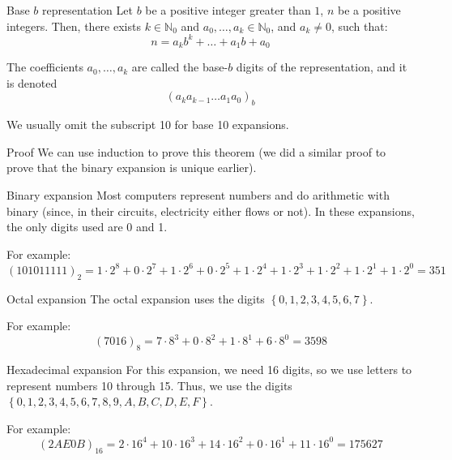 \documentclass[a4paper]{article}
\begin{document}
\begin{parag}{Base $b$ representation}
    Let $b$ be a positive integer greater than $1$, $n$ be a positive integers. Then, there exists $k \in \mathbb{N}_0$ and $a_0, \ldots, a_k \in \mathbb{N}_0$, and $a_k \neq 0$, such that:
    \[n = a_k b^k + \ldots + a_1 b + a_0\]

    The coefficients $a_0, \ldots, a_k$ are called the base-$b$ digits of the representation, and it is denoted 
    \[\left(a_k a_{k-1} \ldots a_1 a_0\right)_b\]

    We usually omit the subscript 10 for base 10 expansions.

    \begin{subparag}{Proof}
        We can use induction to prove this theorem (we did a similar proof to prove that the binary expansion is unique earlier).
    \end{subparag}
\end{parag}

\begin{parag}{Binary expansion}
    Most computers represent numbers and do arithmetic with binary (since, in their circuits, electricity either flows or not). In these expansions, the only digits used are 0 and 1.

    For example: 
    \[\left(1 0101 1111\right)_2 = 1\cdot 2^8 + 0\cdot 2^7 + 1\cdot 2^6 + 0\cdot 2^5 + 1\cdot 2^4 + 1\cdot 2^3 + 1\cdot 2^2 + 1\cdot 2^1 + 1\cdot 2^0 = 351\]
\end{parag}

\begin{parag}{Octal expansion}
    The octal expansion uses the digits $\left\{0,1,2,3,4,5,6,7\right\}$.

    For example: 
    \[\left(7016\right)_8 = 7\cdot 8^3 + 0\cdot 8^2 + 1\cdot 8^1 + 6\cdot 8^0 = 3598\]
\end{parag}

\begin{parag}{Hexadecimal expansion}
    For this expansion, we need 16 digits, so we use letters to represent numbers 10 through 15. Thus, we use the digits $\left\{0,1,2,3,4,5,6,7,8,9,A,B,C,D,E,F\right\}$.

    For example: 
    \[\left(2AE0B\right)_{16} = 2\cdot 16^4 + 10\cdot 16^3 + 14\cdot 16^2 + 0\cdot 16^1 + 11\cdot 16^0 = 175627\]
\end{parag}
\end{document}
